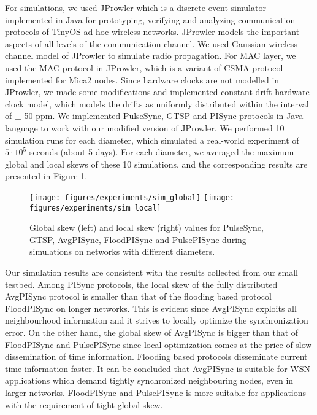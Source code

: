 \documentclass[english,a4paper,10pt,final]{article}
\numberwithin{equation}{section}
\numberwithin{figure}{section}
\begin{document}
For simulations, we used JProwler \cite{JProwler} which is a discrete event simulator implemented in Java for prototyping, verifying and analyzing communication protocols of TinyOS ad-hoc wireless networks. JProwler models the important aspects of all levels of the communication channel. We used Gaussian wireless channel model of JProwler to simulate radio propagation. For MAC layer, we used the MAC protocol in JProwler, which is a variant of CSMA protocol implemented for Mica2 nodes. Since hardware clocks are not modelled in JProwler, we made some modifications and implemented constant drift hardware clock model, which models the drifts as uniformly distributed within the interval of $\pm$ 50 ppm. We implemented PulseSync, GTSP and PISync protocols in Java language to work with our modified version of JProwler. We performed 10 simulation runs for each diameter, which simulated a real-world experiment of $5\cdot10^5$ seconds (about 5 days). For each diameter, we averaged the maximum global and local skews of these 10 simulations, and the corresponding results are presented in Figure \ref{fig:simulations}.

\begin{figure}
\center

\texttt{[image: figures/experiments/sim\_global]}
\texttt{[image: figures/experiments/sim\_local]}

\caption{\label{fig:simulations} Global skew (left) and local skew (right) values for PulseSync, GTSP, AvgPISync, FloodPISync and PulsePISync during simulations on networks with different diameters.}
\end{figure}

Our simulation results are consistent with the results collected from our small testbed. Among PISync protocols, the local skew of the fully distributed AvgPISync protocol is smaller than that of the flooding based protocol FloodPISync on longer networks. This is evident since AvgPISync exploits all neighbourhood information and it strives to locally optimize the synchronization error. On the other hand, the global skew of AvgPISync is bigger than that of FloodPISync and PulsePISync since local optimization comes at the price of slow dissemination of time information. Flooding based protocols disseminate current time information faster. It can be concluded that AvgPISync is suitable for WSN applications which demand tightly synchronized neighbouring nodes, even in larger networks. FloodPISync and PulsePISync is more suitable for applications with the requirement of tight global skew. 
\end{document}

